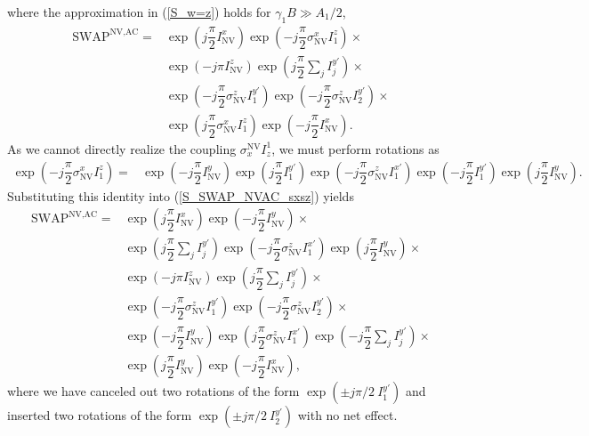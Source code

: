 \documentclass[twocolumn]{revtex4-1}
\renewcommand{\t}{\text} %
\newcommand{\f}[2]{\dfrac{#1}{#2}} %
\newcommand{\p}[1]{\left(#1\right)} %
\newcommand{\SWAP}{\t{SWAP}}
\newcommand{\NV}{\t{NV}}
\newcommand{\AC}{\t{AC}}
\begin{document}
where the approximation in (\ref{S_w=z}) holds for
$\gamma_1B\gg A_1/2$,
\begin{align}
  \SWAP^{\NV,\AC}
  =& \exp\p{j\f\pi2 I_\NV^x}
     \exp\p{-j\f\pi2 \sigma_\NV^x I_1^z} \times \tag*{} \\
   & \exp\p{-j\pi I_\NV^z}
     \exp\p{j\f\pi2\sum_jI_j^{y'}} \times \tag*{} \\
   & \exp\p{-j\f\pi2 \sigma_\NV^z I_1^{y'}}
     \exp\p{-j\f\pi2 \sigma_\NV^z I_2^{y'}} \times \tag*{} \\
   & \exp\p{j\f\pi2 \sigma_\NV^x I_1^z} \exp\p{-j\f\pi2 I_\NV^x}.
  \label{S_SWAP_NVAC_sxsz}
\end{align}
As we cannot directly realize the coupling $\sigma_x^\NV I_z^1$,
we must perform rotations as
\begin{align}
  \exp\p{-j\f\pi2 \sigma_\NV^x I_1^z}
  =& \exp\p{-j\f\pi2 I_\NV^y} \exp\p{j\f\pi2 I_1^{y'}}
     \exp\p{-j\f\pi2 \sigma_\NV^z I_1^{x'}}
     \exp\p{-j\f\pi2 I_1^{y'}} \exp\p{j\f\pi2 I_\NV^y}.
\end{align}
Substituting this identity into (\ref{S_SWAP_NVAC_sxsz}) yields
\begin{align}
  \SWAP^{\NV,\AC}
  =& \exp\p{j\f\pi2 I_\NV^x} \exp\p{-j\f\pi2 I_\NV^y} \times \tag*{} \\
   & \exp\p{j\f\pi2\sum_jI_j^{y'}}
     \exp\p{-j\f\pi2 \sigma_\NV^z I_1^{x'}}
     \exp\p{j\f\pi2 I_\NV^y} \times \tag*{} \\
   & \exp\p{-j\pi I_\NV^z}
     \exp\p{j\f\pi2\sum_jI_j^{y'}} \times \tag*{} \\
   & \exp\p{-j\f\pi2 \sigma_\NV^z I_1^{y'}}
     \exp\p{-j\f\pi2 \sigma_\NV^z I_2^{y'}} \times \tag*{} \\
   & \exp\p{-j\f\pi2 I_\NV^y}
     \exp\p{j\f\pi2 \sigma_\NV^z I_1^{x'}}
     \exp\p{-j\f\pi2\sum_jI_j^{y'}} \times \tag*{} \\
   & \exp\p{j\f\pi2 I_\NV^y} \exp\p{-j\f\pi2 I_\NV^x},
  \label{S_SWAP_NVAC}
\end{align}
where we have canceled out two rotations of the form
$\exp\p{\pm j\pi/2~I_1^{y'}}$ and inserted two rotations of the form
$\exp\p{\pm j\pi/2~I_2^{y'}}$ with no net effect.
\end{document}

